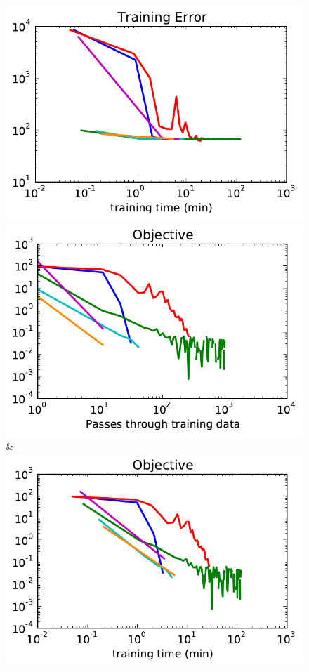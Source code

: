 \begin{figure}
\begin{tabu}
    \includegraphics[width=\linewidth]{evaluation/images/msrc_time_loss}\\
    \includegraphics[width=\linewidth]{evaluation/images/msrc}&%
    \includegraphics[width=\linewidth]{evaluation/images/msrc_time}\\

\end{tabu}
\end{figure}
